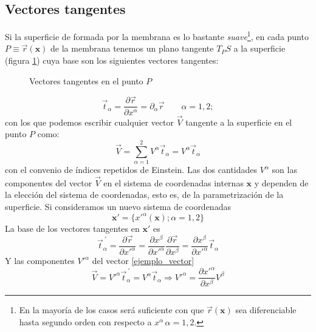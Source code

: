 \subsection{Vectores tangentes}

Si la superficie de formada por la membrana es lo bastante
\textit{suave}\footnote{En la mayoría de los casos será suficiente con que
 $\vec{r}(\mathbf{x})$ sea diferenciable hasta segundo orden con respecto a
 $x^{\alpha}\, \alpha=1,2$.}, en cada punto $P\equiv\vec{r}(\mathbf{x})$ de la
membrana tenemos un plano tangente $T_PS$ a la superficie (figura
\ref{vectores_tang-fig}) cuya base son los siguientes vectores tangentes:
\begin{figure}[h]
\centering
 
\caption{Vectores tangentes en el punto $P$}\label{vectores_tang-fig}
\end{figure}

\begin{equation*}
\vec{t}_{\alpha}=\frac{\partial \vec{r}}{\partial
  x^{\alpha}}=\partial_{\alpha}\vec{r} \qquad \alpha=1,2;
\end{equation*}
con los que podemos escribir cualquier vector $\vec{V}$ tangente a la superficie en el punto $P$ como:
\begin{equation}\label{ejemplo_vector} 
  \vec{V}=\sum^2_{\alpha=1}V^{\alpha}\vec{t}_{\alpha}=V^{\alpha}\vec{t}_{\alpha}
\end{equation}
con el convenio de índices repetidos de Einstein. Las dos cantidades
$V^{\alpha}$ son las componentes del vector $\vec{V}$ en el sistema de
coordenadas internas $\mathbf{x}$ y dependen de la elección del sistema de
coordenadas, esto es, de la parametrización de la superficie. Si consideramos
un nuevo sistema de coordenadas  
\begin{equation*}
 \mathbf{x}'=\{x'^{\alpha}(\mathbf{x}); \alpha=1,2\}
\end{equation*}
La base de los vectores tangentes en $\mathbf{x}'$ es
\begin{equation*}
\vec{t}_{\alpha}^{\ '}=\frac{\partial \vec{r}}{\partial x'^{\alpha}}=
\frac{\partial x^{\beta}}{\partial x'^{\alpha}}\frac{\partial \vec{r}}{\partial x^{\beta}}=\frac{\partial x^{\beta}}{\partial x'^{\alpha}}\vec{t}_{\alpha}
\end{equation*}
Y las componentes $V'^{\alpha}$ del vector \eqref{ejemplo_vector}
\begin{equation} 
  \vec{V}=V'^{\alpha}\vec{t}_{\alpha}^{\
    '}=V^{\alpha}\vec{t}_{\alpha}\Rightarrow V'^{\alpha}=\frac{\partial x'^{\alpha}}{\partial x^{\beta}}V^{\beta}
\end{equation}

